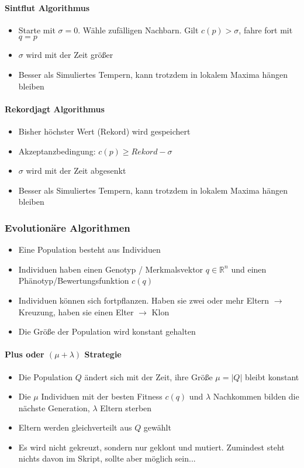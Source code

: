 \paragraph{Sintflut Algorithmus}
\begin{itemize}
	\item Starte mit $\sigma = 0$. Wähle zufälligen Nachbarn. Gilt $c(p) > \sigma$, fahre fort mit $q = p$
	\item $\sigma$ wird mit der Zeit größer
	\item Besser als Simuliertes Tempern, kann trotzdem in lokalem Maxima hängen bleiben
\end{itemize}

\paragraph{Rekordjagt Algorithmus}
\begin{itemize}
	\item Bisher höchster Wert (Rekord) wird gespeichert
	\item Akzeptanzbedingung: \(c(p) \geq Rekord - \sigma\)
	\item \(\sigma\) wird mit der Zeit abgesenkt
	\item Besser als Simuliertes Tempern, kann trotzdem in lokalem Maxima hängen bleiben
\end{itemize}

\subsubsection{Evolutionäre Algorithmen}
\begin{itemize}
	\item Eine Population besteht aus Individuen
	\item Individuen haben einen Genotyp / Merkmalsvektor \(q \in \mathbb{R}^n\) und einen Phänotyp/Bewertungsfunktion \(c(q)\)
	\item Individuen können sich fortpflanzen. Haben sie zwei oder mehr Eltern $\rightarrow$ Kreuzung, haben sie einen Elter $\rightarrow$ Klon
	\item Die Größe der Population wird konstant gehalten
\end{itemize}

\paragraph{Plus oder $(\mu + \lambda)$ Strategie}
\begin{itemize}
	\item Die Population \(Q\) ändert sich mit der Zeit, ihre Größe \(\mu = |Q|\) bleibt konstant
	\item Die \(\mu\) Individuen mit der besten Fitness \(c(q)\) und \(\lambda\) Nachkommen bilden die nächste Generation, \(\lambda\) Eltern sterben
	\item Eltern werden gleichverteilt aus \(Q\) gewählt
	\item Es wird nicht gekreuzt, sondern nur geklont und mutiert. Zumindest steht nichts davon im Skript, sollte aber möglich sein...
\end{itemize}

